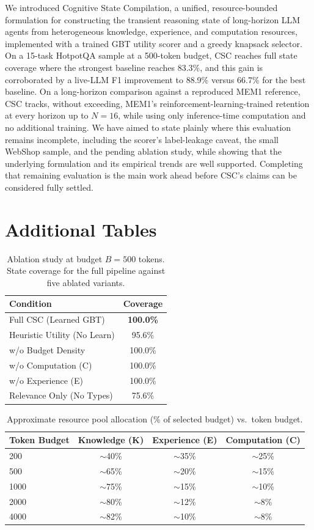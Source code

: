 \documentclass{article}
\begin{document}
We introduced Cognitive State Compilation, a unified, resource-bounded formulation for constructing the transient reasoning state of long-horizon LLM agents from heterogeneous knowledge, experience, and computation resources, implemented with a trained GBT utility scorer and a greedy knapsack selector. On a 15-task HotpotQA sample at a 500-token budget, CSC reaches full state coverage where the strongest baseline reaches 83.3\%, and this gain is corroborated by a live-LLM F1 improvement to 88.9\% versus 66.7\% for the best baseline. On a long-horizon comparison against a reproduced MEM1 reference, CSC tracks, without exceeding, MEM1's reinforcement-learning-trained retention at every horizon up to $N=16$, while using only inference-time computation and no additional training. We have aimed to state plainly where this evaluation remains incomplete, including the scorer's label-leakage caveat, the small WebShop sample, and the pending ablation study, while showing that the underlying formulation and its empirical trends are well supported. Completing that remaining evaluation is the main work ahead before CSC's claims can be considered fully settled.

\appendix

\section{Additional Tables}

\begin{table}[h]
\caption{Ablation study at budget $B=500$ tokens. State coverage for the full pipeline against five ablated variants.}
\centering
\begin{tabular}{lc}
\toprule
Condition & Coverage \\
\midrule
Full CSC (Learned GBT) & \textbf{100.0\%} \\
Heuristic Utility (No Learn) & 95.6\% \\
w/o Budget Density & 100.0\% \\
w/o Computation (C) & 100.0\% \\
w/o Experience (E) & 100.0\% \\
Relevance Only (No Types) & 75.6\% \\
\bottomrule
\end{tabular}
\end{table}

\begin{table}[h]
\caption{Approximate resource pool allocation (\% of selected budget) vs.\ token budget.}
\centering
\begin{tabular}{lccc}
\toprule
Token Budget & Knowledge (K) & Experience (E) & Computation (C) \\
\midrule
200 & $\sim$40\% & $\sim$35\% & $\sim$25\% \\
500 & $\sim$65\% & $\sim$20\% & $\sim$15\% \\
1000 & $\sim$75\% & $\sim$15\% & $\sim$10\% \\
2000 & $\sim$80\% & $\sim$12\% & $\sim$8\% \\
4000 & $\sim$82\% & $\sim$10\% & $\sim$8\% \\
\bottomrule
\end{tabular}
\end{table}





\end{document}
